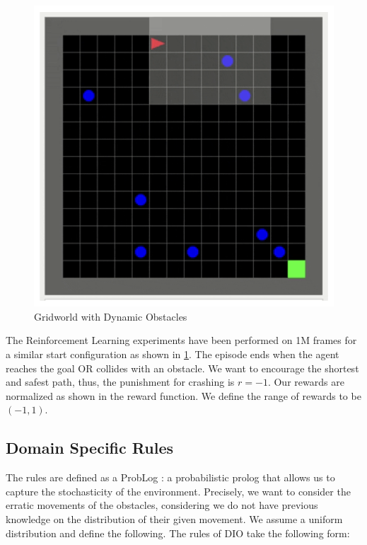 \documentclass[a4paper,11pt]{article}
\theoremstyle{definition}
\begin{document}
\begin{multicols}{2}
    \begin{figure}[H]
      \centering
      \includegraphics[scale=0.55]{gridworldrl.png}
      \caption{Gridworld with Dynamic Obstacles}
      \label{fig:gridrl}
    \end{figure}
    \columnbreak
    The Reinforcement Learning experiments have been performed on 1M frames for a similar start configuration as shown in \ref{fig:gridrl}. The episode ends when the agent 
    reaches the goal OR collides with an obstacle. We want to encourage the shortest and safest path, thus, the punishment for crashing is $r = -1$. Our rewards are normalized as shown in
    the reward function. We define the range of rewards to be $(-1,1)$. 
\end{multicols}

\subsection{Domain Specific Rules}
The rules are defined as a ProbLog \cite{problog}: a probabilistic prolog that allows us to capture 
the stochasticity of the environment. Precisely, we want to consider the erratic movements of the obstacles, considering 
we do not have previous knowledge on the distribution of their given movement. We assume a uniform distribution and define the following. 
The rules of DIO take the following form: 
\end{document}
